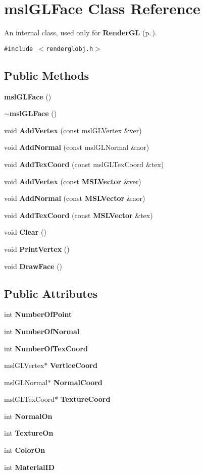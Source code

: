 \section{msl\-GLFace  Class Reference}
\label{class_mslGLFace}
An internal class, used only for {\bf Render\-GL} {\rm (p.\,\pageref{class_RenderGL})}. 


{\tt \#include $<$renderglobj.h$>$}

\subsection*{Public Methods}
\begin{CompactItemize}
\item 
{\bf msl\-GLFace} ()
\item 
{\bf $\sim$msl\-GLFace} ()
\item 
void {\bf Add\-Vertex} (const msl\-GLVertex \&ver)
\item 
void {\bf Add\-Normal} (const msl\-GLNormal \&nor)
\item 
void {\bf Add\-Tex\-Coord} (const msl\-GLTex\-Coord \&tex)
\item 
void {\bf Add\-Vertex} (const {\bf MSLVector} \&ver)
\item 
void {\bf Add\-Normal} (const {\bf MSLVector} \&nor)
\item 
void {\bf Add\-Tex\-Coord} (const {\bf MSLVector} \&tex)
\item 
void {\bf Clear} ()
\item 
void {\bf Print\-Vertex} ()
\item 
void {\bf Draw\-Face} ()
\end{CompactItemize}
\subsection*{Public Attributes}
\begin{CompactItemize}
\item 
int {\bf Number\-Of\-Point}
\item 
int {\bf Number\-Of\-Normal}
\item 
int {\bf Number\-Of\-Tex\-Coord}
\item 
msl\-GLVertex$\ast$ {\bf Vertice\-Coord}
\item 
msl\-GLNormal$\ast$ {\bf Normal\-Coord}
\item 
msl\-GLTex\-Coord$\ast$ {\bf Texture\-Coord}
\item 
int {\bf Normal\-On}
\item 
int {\bf Texture\-On}
\item 
int {\bf Color\-On}
\item 
int {\bf Material\-ID}
\end{CompactItemize}


